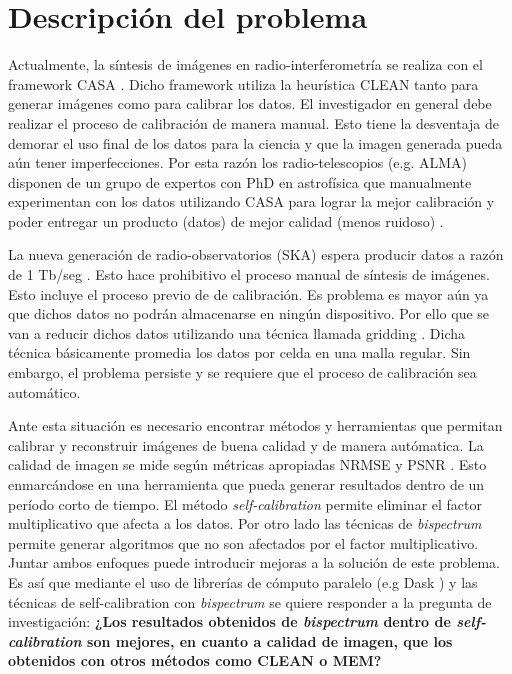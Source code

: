 \section{Descripci\'on del problema}
\label{intro:problema}

Actualmente, la síntesis de imágenes en radio-interferometría se realiza con el framework CASA \citep{bean2022casa}. Dicho framework utiliza la heurística CLEAN tanto para generar imágenes como para calibrar los datos. El investigador en general debe realizar el proceso de calibración de manera manual. Esto tiene la desventaja de demorar el uso final de los datos para la ciencia y que la imagen generada pueda aún tener imperfecciones. Por esta razón los radio-telescopios (e.g. ALMA) disponen de un grupo de expertos con PhD en astrofísica que manualmente experimentan con los datos utilizando CASA para lograr la mejor calibración y poder entregar un producto (datos) de mejor calidad (menos ruidoso) \citep{CasaQA}. 

La nueva generación de radio-observatorios (SKA) espera producir datos a razón de 1 Tb/seg \citep{scaife2020big}. Esto hace prohibitivo el proceso manual de síntesis de imágenes. Esto incluye el proceso previo de de calibración. Es problema es mayor aún ya que dichos datos no podrán almacenarse en ningún dispositivo. Por ello que se van a reducir dichos datos utilizando una técnica llamada gridding \citep{SkaGridding}. Dicha técnica básicamente promedia los datos por celda en una malla regular. Sin embargo, el problema persiste y se requiere que el proceso de calibración sea automático.

Ante esta situación es necesario encontrar métodos y herramientas que permitan calibrar y reconstruir imágenes de buena calidad y de manera autómatica. La calidad de imagen se mide según métricas apropiadas NRMSE \citep{Chael_2018} y PSNR \citep{LiberonaTesis}. Esto enmarcándose en una herramienta que pueda generar resultados dentro de un período corto de tiempo. El método \textit{self-calibration} \citep{selfCalibration} permite eliminar el factor multiplicativo que afecta a los datos. Por otro lado las técnicas de \textit{bispectrum} permite generar algoritmos que no son afectados por el factor multiplicativo. Juntar ambos enfoques puede introducir mejoras a la solución de este problema. Es así que mediante el uso de librerías de cómputo paralelo (e.g Dask \citep{Dask_general}) y las técnicas de self-calibration con {\it bispectrum} se quiere responder a la pregunta de investigación: \textbf{¿Los resultados obtenidos de \textit{bispectrum} dentro de \textit{self-calibration} son mejores, en cuanto a calidad de imagen, que los obtenidos con otros métodos como CLEAN o MEM?}


